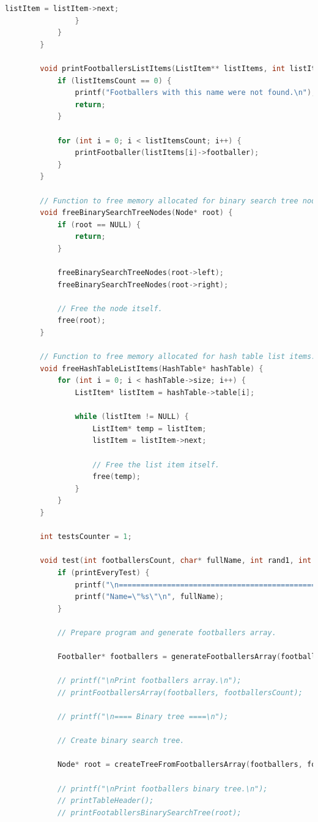 \documentclass[12pt]{article}
\begin{document}
\begin{lstlisting}[language=C]
					listItem = listItem->next;
				}
			}
		}
		
		void printFootballersListItems(ListItem** listItems, int listItemsCount) {
			if (listItemsCount == 0) {
				printf("Footballers with this name were not found.\n");
				return;
			}
			
			for (int i = 0; i < listItemsCount; i++) {
				printFootballer(listItems[i]->footballer);
			}
		}
		
		// Function to free memory allocated for binary search tree nodes.
		void freeBinarySearchTreeNodes(Node* root) {
			if (root == NULL) {
				return;
			}
			
			freeBinarySearchTreeNodes(root->left);
			freeBinarySearchTreeNodes(root->right);
			
			// Free the node itself.
			free(root);
		}
		
		// Function to free memory allocated for hash table list items.
		void freeHashTableListItems(HashTable* hashTable) {
			for (int i = 0; i < hashTable->size; i++) {
				ListItem* listItem = hashTable->table[i];
				
				while (listItem != NULL) {
					ListItem* temp = listItem;
					listItem = listItem->next;
					
					// Free the list item itself.
					free(temp);
				}
			}
		}
		
		int testsCounter = 1;
		
		void test(int footballersCount, char* fullName, int rand1, int rand2, int* binaryTreeAccTime, int* hashTableAccTime, int printEveryTest) {
			if (printEveryTest) {
				printf("\n============================================================= Test %d =============================================================\n\n", testsCounter++);
				printf("Name=\"%s\"\n", fullName);
			}
			
			// Prepare program and generate footballers array.
			
			Footballer* footballers = generateFootballersArray(footballersCount, rand1, rand2);
			
			// printf("\nPrint footballers array.\n");
			// printFootballersArray(footballers, footballersCount);
			
			// printf("\n==== Binary tree ====\n");
			
			// Create binary search tree.
			
			Node* root = createTreeFromFootballersArray(footballers, footballersCount);
			
			// printf("\nPrint footballers binary tree.\n");
			// printTableHeader();
			// printFootabllersBinarySearchTree(root);
			

\end{lstlisting}
\end{document}
